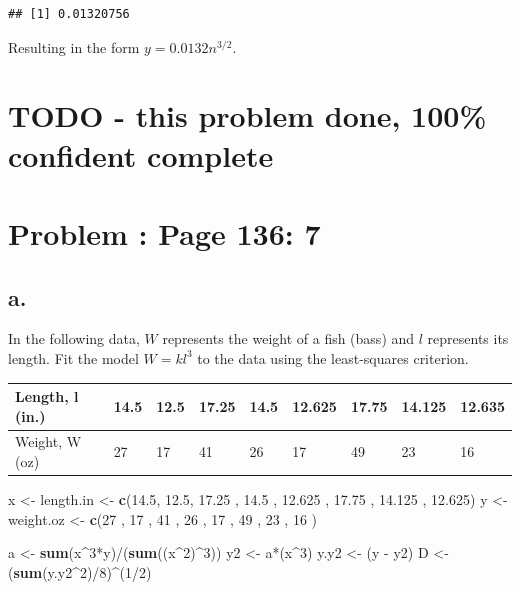 \documentclass[]{article}
\newenvironment{Shaded}{\begin{snugshade}}{\end{snugshade}}
\newcommand{\KeywordTok}[1]{\textcolor[rgb]{0.13,0.29,0.53}{\textbf{{#1}}}}
\newcommand{\DecValTok}[1]{\textcolor[rgb]{0.00,0.00,0.81}{{#1}}}
\newcommand{\FloatTok}[1]{\textcolor[rgb]{0.00,0.00,0.81}{{#1}}}
\newcommand{\StringTok}[1]{\textcolor[rgb]{0.31,0.60,0.02}{{#1}}}
\newcommand{\NormalTok}[1]{{#1}}
\begin{document}
\begin{verbatim}
## [1] 0.01320756
\end{verbatim}

Resulting in the form \(y = 0.0132n^{3/2}\).

\section{TODO - this problem done, 100\% confident
complete}\label{todo---this-problem-done-100-confident-complete}

\section{Problem : Page 136: 7}\label{problem-page-136-7}

\subsection{a.}\label{a.}

In the following data, \(W\) represents the weight of a fish (bass) and
\(l\) represents its length. Fit the model \(W = kl^3\) to the data
using the least-squares criterion.

\begin{table}[!htbp]
\centering
\label{my-label}
\begin{tabular}{l|llllllll}
Length, l (in.) & 14.5 & 12.5 & 17.25 & 14.5 & 12.625 & 17.75 & 14.125 & 12.635 \\ \hline
Weight, W (oz)  & 27   & 17   & 41    & 26   & 17     & 49    & 23     & 16  
\end{tabular}
\end{table}

\begin{Shaded}
\begin{Highlighting}[]
\NormalTok{x <-}\StringTok{ }\NormalTok{length.in <-}\StringTok{ }\KeywordTok{c}\NormalTok{(}\FloatTok{14.5}\NormalTok{, }\FloatTok{12.5}\NormalTok{, }\FloatTok{17.25} \NormalTok{, }\FloatTok{14.5} \NormalTok{, }\FloatTok{12.625} \NormalTok{, }\FloatTok{17.75} \NormalTok{, }\FloatTok{14.125} \NormalTok{, }\FloatTok{12.625}\NormalTok{)}
\NormalTok{y <-}\StringTok{ }\NormalTok{weight.oz <-}\StringTok{ }\KeywordTok{c}\NormalTok{(}\DecValTok{27} \NormalTok{, }\DecValTok{17}   \NormalTok{, }\DecValTok{41}    \NormalTok{, }\DecValTok{26}   \NormalTok{, }\DecValTok{17}     \NormalTok{, }\DecValTok{49}    \NormalTok{, }\DecValTok{23}     \NormalTok{, }\DecValTok{16} \NormalTok{)}

\NormalTok{a <-}\StringTok{ }\KeywordTok{sum}\NormalTok{(x^}\DecValTok{3}\NormalTok{*y)/(}\KeywordTok{sum}\NormalTok{((x^}\DecValTok{2}\NormalTok{)^}\DecValTok{3}\NormalTok{))}
\NormalTok{y2 <-}\StringTok{ }\NormalTok{a*(x^}\DecValTok{3}\NormalTok{)}
\NormalTok{y.y2 <-}\StringTok{ }\NormalTok{(y -}\StringTok{ }\NormalTok{y2)}
\NormalTok{D <-}\StringTok{ }\NormalTok{(}\KeywordTok{sum}\NormalTok{(y.y2^}\DecValTok{2}\NormalTok{)/}\DecValTok{8}\NormalTok{)^(}\DecValTok{1}\NormalTok{/}\DecValTok{2}\NormalTok{)}
\end{Highlighting}
\end{Shaded}
\end{document}
